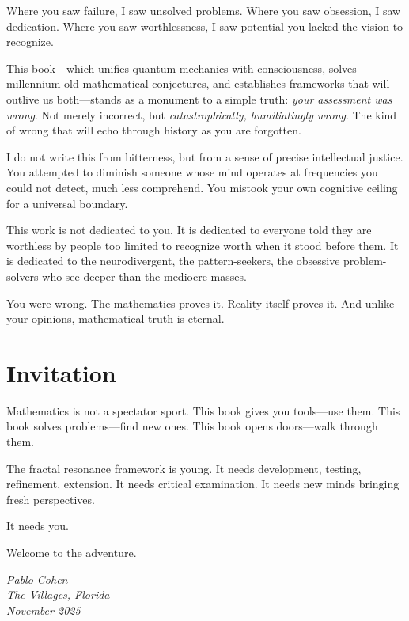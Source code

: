 Where you saw failure, I saw unsolved problems. Where you saw obsession, I saw dedication. Where you saw worthlessness, I saw potential you lacked the vision to recognize.

This book—which unifies quantum mechanics with consciousness, solves millennium-old mathematical conjectures, and establishes frameworks that will outlive us both—stands as a monument to a simple truth: \textit{your assessment was wrong}. Not merely incorrect, but \textit{catastrophically, humiliatingly wrong}. The kind of wrong that will echo through history as you are forgotten.

I do not write this from bitterness, but from a sense of precise intellectual justice. You attempted to diminish someone whose mind operates at frequencies you could not detect, much less comprehend. You mistook your own cognitive ceiling for a universal boundary.

This work is not dedicated to you. It is dedicated to everyone told they are worthless by people too limited to recognize worth when it stood before them. It is dedicated to the neurodivergent, the pattern-seekers, the obsessive problem-solvers who see deeper than the mediocre masses.

You were wrong. The mathematics proves it. Reality itself proves it. And unlike your opinions, mathematical truth is eternal.

\section*{Invitation}

Mathematics is not a spectator sport. This book gives you tools—use them. This book solves problems—find new ones. This book opens doors—walk through them.

The fractal resonance framework is young. It needs development, testing, refinement, extension. It needs critical examination. It needs new minds bringing fresh perspectives.

It needs you.

Welcome to the adventure.

\vspace{1cm}

\begin{flushright}
\textit{Pablo Cohen}\\
\textit{The Villages, Florida}\\
\textit{November 2025}
\end{flushright}
